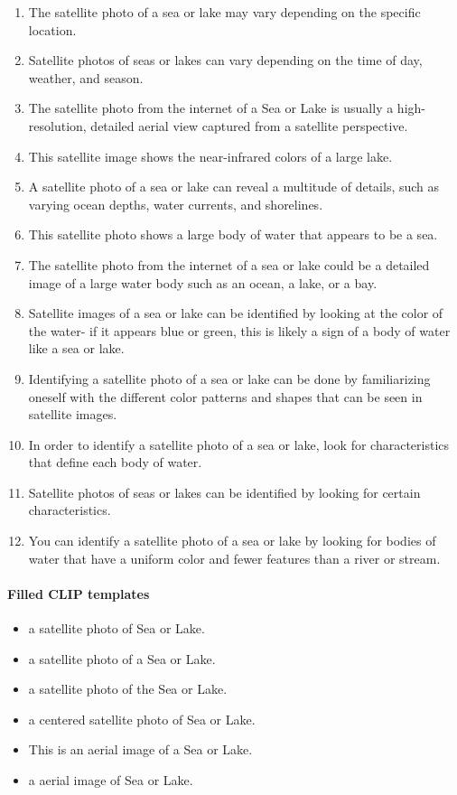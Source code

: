 \documentclass[11pt]{article}
\begin{document}
\begin{enumerate}
\item The satellite photo of a sea or lake may vary depending on the specific location.
\item Satellite photos of seas or lakes can vary depending on the time of day, weather, and season.
\item The satellite photo from the internet of a Sea or Lake is usually a high-resolution, detailed aerial view captured from a satellite perspective.
\item This satellite image shows the near-infrared colors of a large lake.
\item A satellite photo of a sea or lake can reveal a multitude of details, such as varying ocean depths, water currents, and shorelines.
\item This satellite photo shows a large body of water that appears to be a sea.
\item The satellite photo from the internet of a sea or lake could be a detailed image of a large water body such as an ocean, a lake, or a bay.
\item Satellite images of a sea or lake can be identified by looking at the color of the water- if it appears blue or green, this is likely a sign of a body of water like a sea or lake.
\item Identifying a satellite photo of a sea or lake can be done by familiarizing oneself with the different color patterns and shapes that can be seen in satellite images.
\item In order to identify a satellite photo of a sea or lake, look for characteristics that define each body of water.
\item Satellite photos of seas or lakes can be identified by looking for certain characteristics.
\item You can identify a satellite photo of a sea or lake by looking for bodies of water that have a uniform color and fewer features than a river or stream.
\end{enumerate}
\paragraph{Filled CLIP templates}\begin{itemize}
\item a satellite photo of Sea or Lake.
\item a satellite photo of a Sea or Lake.
\item a satellite photo of the Sea or Lake.
\item a centered satellite photo of Sea or Lake.
\item This is an aerial image of a Sea or Lake.
\item a aerial image of Sea or Lake.
\end{itemize}
\end{document}
